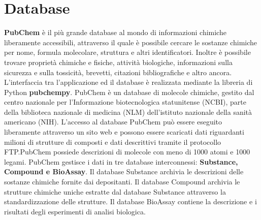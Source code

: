 \section{Database}
\def\baselinestretch{1.66}
\noindent \textbf{PubChem} è il più grande database al mondo di informazioni chimiche liberamente accessibili, attraverso il quale è possibile cercare le sostanze chimiche per nome, formula molecolare, struttura e altri identificatori. Inoltre è possibile trovare proprietà chimiche e fisiche, attività biologiche, informazioni sulla sicurezza e sulla tossicità, brevetti, citazioni bibliografiche e altro ancora. L'interfaccia tra l'applicazione ed il database è realizzata mediante la libreria di Python \textbf{pubchempy}.\newline
PubChem è un database di molecole chimiche, gestito dal centro nazionale per l'Informazione biotecnologica statunitense (NCBI), parte della biblioteca nazionale di medicina (NLM) dell'istituto nazionale della sanità americano (NIH). L'accesso al database PubChem può essere eseguito liberamente attraverso un sito web e possono essere scaricati dati riguardanti milioni di strutture di composti e dati descrittivi tramite il protocollo FTP.PubChem possiede descrizioni di molecole con meno di 1000 atomi e 1000 legami. \newline 
PubChem gestisce i dati in tre database interconnessi: \textbf{Substance, Compound e BioAssay}. Il database Substance archivia le descrizioni delle sostanze chimiche fornite dai depositanti. Il database Compound archivia le strutture chimiche uniche estratte dal database Substance attraverso la standardizzazione delle strutture. Il database BioAssay contiene la descrizione e i risultati degli esperimenti di analisi biologica.

